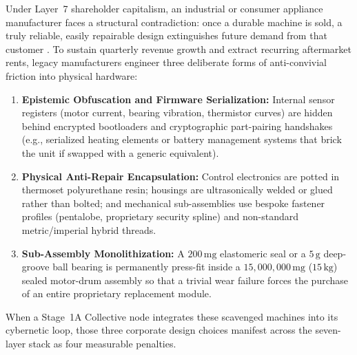 Under Layer~7 shareholder capitalism, an industrial or consumer appliance manufacturer faces a structural contradiction: once a durable machine is sold, a truly reliable, easily repairable design extinguishes future demand from that customer \parencite{georgescu1971entropy,perzanowski2022right}. To sustain quarterly revenue growth and extract recurring aftermarket rents, legacy manufacturers engineer three deliberate forms of anti-convivial friction into physical hardware:
\begin{enumerate}
    \item \textbf{Epistemic Obfuscation and Firmware Serialization:} Internal sensor registers (motor current, bearing vibration, thermistor curves) are hidden behind encrypted bootloaders and cryptographic part-pairing handshakes (e.g., serialized heating elements or battery management systems that brick the unit if swapped with a generic equivalent).
    \item \textbf{Physical Anti-Repair Encapsulation:} Control electronics are potted in thermoset polyurethane resin; housings are ultrasonically welded or glued rather than bolted; and mechanical sub-assemblies use bespoke fastener profiles (pentalobe, proprietary security spline) and non-standard metric/imperial hybrid threads.
    \item \textbf{Sub-Assembly Monolithization:} A $200\,\mathrm{mg}$ elastomeric seal or a $5\,\mathrm{g}$ deep-groove ball bearing is permanently press-fit inside a $15{,}000{,}000\,\mathrm{mg}$ ($15\,\mathrm{kg}$) sealed motor-drum assembly so that a trivial wear failure forces the purchase of an entire proprietary replacement module.
\end{enumerate}

When a Stage~1A Collective node integrates these scavenged machines into its cybernetic loop, those three corporate design choices manifest across the seven-layer stack as four measurable penalties.

